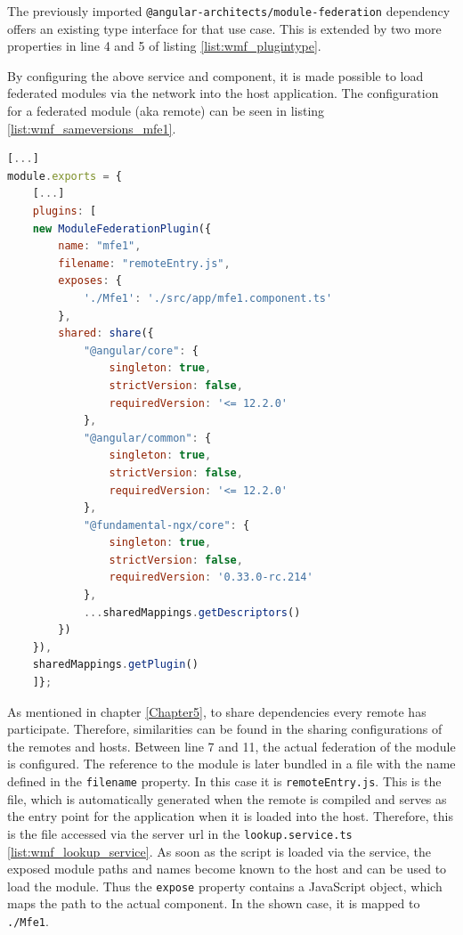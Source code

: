 The previously imported \texttt{@angular-architects/module-federation} dependency offers an existing type interface for that use case. This is extended by two more properties in line 4 and 5 of listing \ref{list:wmf_plugintype}.

By configuring the above service and component, it is made possible to load federated modules via the network into the host application.
The configuration for a federated module (aka remote) can be seen in listing \ref{list:wmf_sameversions_mfe1}.

\begin{lstlisting}[language=JavaScript, caption=Content of \texttt{webpack.config.js} of the mfe1 remote app of the same versions WMF project, label=list:wmf_sameversions_mfe1,  xleftmargin=.0\textwidth, xrightmargin=.0\textwidth]
[...]
module.exports = {
	[...]
	plugins: [
	new ModuleFederationPlugin({
		name: "mfe1",
		filename: "remoteEntry.js",
		exposes: {
			'./Mfe1': './src/app/mfe1.component.ts'
		},
		shared: share({
			"@angular/core": { 
				singleton: true, 
				strictVersion: false, 
				requiredVersion: '<= 12.2.0' 
			},
			"@angular/common": { 
				singleton: true, 
				strictVersion: false, 
				requiredVersion: '<= 12.2.0' 
			},
			"@fundamental-ngx/core": { 
				singleton: true, 
				strictVersion: false,
				requiredVersion: '0.33.0-rc.214' 
			},
			...sharedMappings.getDescriptors()
		})
	}),
	sharedMappings.getPlugin()
	]};
\end{lstlisting}

As mentioned in chapter \ref{Chapter5}, to share dependencies every remote has participate. Therefore, similarities can be found in the sharing configurations of the remotes and hosts. 
Between line 7 and 11, the actual federation of the module is configured. The reference to the module is later bundled in a file with the name defined in the \texttt{filename} property. In this case it is \texttt{remoteEntry.js}.
This is the file, which is automatically generated when the remote is compiled and serves as the entry point for the application when it is loaded into the host. Therefore, this is the file accessed via the server url in the \texttt{lookup.service.ts} \ref{list:wmf_lookup_service}.
As soon as the script is loaded via the service, the exposed module paths and names become known to the host and can be used to load the module. Thus the \texttt{expose} property contains a JavaScript object, which maps the path to the actual component. In the shown case, it is mapped to \texttt{./Mfe1}.\cite{wmf_concepts}

